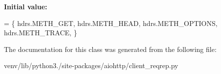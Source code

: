 {\bfseries Initial value\+:}
\begin{DoxyCode}
=  \{
        hdrs.METH\_GET,
        hdrs.METH\_HEAD,
        hdrs.METH\_OPTIONS,
        hdrs.METH\_TRACE,
    \}
\end{DoxyCode}


The documentation for this class was generated from the following file\+:\begin{DoxyCompactItemize}
\item 
venv/lib/python3./site-\/packages/aiohttp/client\+\_\+reqrep.\+py\end{DoxyCompactItemize}
